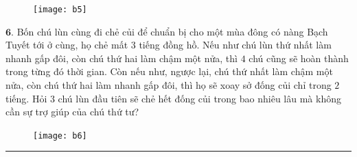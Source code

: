 \begin{multicols}{2}
\begin{figure}[H]
		\centering
		\captionsetup{labelformat= empty, justification=centering}
		\texttt{[image: b5]}
		\vspace*{-15pt}
	\end{figure}
	$\pmb{6.}$	Bốn chú lùn cùng đi chẻ củi để chuẩn bị cho một mùa đông có nàng Bạch Tuyết tới ở cùng, họ chẻ mất  $3$ tiếng đồng hồ. Nếu như chú lùn thứ nhất làm nhanh gấp đôi, còn chú thứ hai làm chậm một nửa, thì $4$ chú cũng sẽ hoàn thành trong từng đó thời gian. Còn nếu như, ngược lại, chú thứ nhất làm chậm một nửa, còn chú thứ hai làm nhanh gấp đôi, thì họ sẽ xoay sở  đống củi chỉ trong $2$ tiếng.
	\vskip 0.1cm
	Hỏi $3$ chú lùn đầu tiên sẽ chẻ hết đống củi trong bao nhiêu lâu mà không cần sự trợ giúp của chú thứ tư?
	\begin{figure}[H]
		\centering
		\captionsetup{labelformat= empty, justification=centering}
		\texttt{[image: b6]}
		\vspace*{-10pt}
	\end{figure}
\end{multicols}
\vspace*{-10pt}
\rule{1\linewidth}{0.1pt}
\begingroup
{} 
\centering
\endgroup
\vspace*{80pt}

